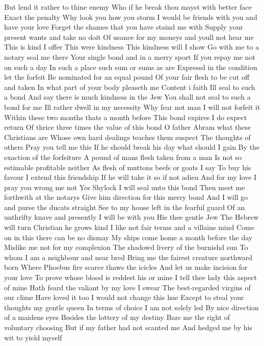 But lend it rather to thine enemy
Who if he break thou mayst with better face
Exact the penalty
Why look you how you storm
I would be friends with you and have your love
Forget the shames that you have staind me with
Supply your present wants and take no doit
Of usance for my moneys and youll not hear me
This is kind I offer
This were kindness
This kindness will I show
Go with me to a notary seal me there
Your single bond and in a merry sport
If you repay me not on such a day
In such a place such sum or sums as are
Expressd in the condition let the forfeit
Be nominated for an equal pound
Of your fair flesh to be cut off and taken
In what part of your body pleaseth me
Content i faith Ill seal to such a bond
And say there is much kindness in the Jew
You shall not seal to such a bond for me
Ill rather dwell in my necessity
Why fear not man I will not forfeit it
Within these two months thats a month before
This bond expires I do expect return
Of thrice three times the value of this bond
O father Abram what these Christians are
Whose own hard dealings teaches them suspect
The thoughts of others Pray you tell me this
If he should break his day what should I gain
By the exaction of the forfeiture
A pound of mans flesh taken from a man
Is not so estimable profitable neither
As flesh of muttons beefs or goats I say
To buy his favour I extend this friendship
If he will take it so if not adieu
And for my love I pray you wrong me not
Yes Shylock I will seal unto this bond
Then meet me forthwith at the notarys
Give him direction for this merry bond
And I will go and purse the ducats straight
See to my house left in the fearful guard
Of an unthrifty knave and presently
I will be with you
Hie thee gentle Jew
The Hebrew will turn Christian he grows kind
I like not fair terms and a villains mind
Come on in this there can be no dismay
My ships come home a month before the day
Mislike me not for my complexion
The shadowd livery of the burnishd sun
To whom I am a neighbour and near bred
Bring me the fairest creature northward born
Where Phoebus fire scarce thaws the icicles
And let us make incision for your love
To prove whose blood is reddest his or mine
I tell thee lady this aspect of mine
Hath feard the valiant by my love I swear
The best-regarded virgins of our clime
Have loved it too I would not change this hue
Except to steal your thoughts my gentle queen
In terms of choice I am not solely led
By nice direction of a maidens eyes
Besides the lottery of my destiny
Bars me the right of voluntary choosing
But if my father had not scanted me
And hedged me by his wit to yield myself
